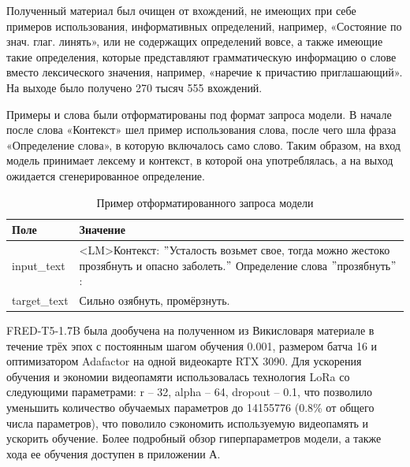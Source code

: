 \documentclass[LI,VKR]{HSEUniversity}
\begin{document}
Полученный материал был очищен от вхождений, не имеющих при себе примеров использования,
информативных определений, например, «Состояние по знач. глаг. линять»,
или не содержащих определений вовсе, а также имеющие такие определения,
которые представляют грамматическую информацию о слове вместо лексического значения,
например, «наречие к причастию приглашающий».
На выходе было получено 270 тысяч 555 вхождений.

Примеры и слова были отформатированы под формат запроса модели.
В начале после слова «Контекст» шел пример использования слова, после чего шла фраза
«Определение слова», в которую включалось само слово.
Таким образом, на вход модель
принимает лексему и контекст, в которой она употреблялась, а на выход ожидается сгенерированное
определение.

\begin{table}[h]
\centering
\caption{Пример отформатированного запроса модели}
\begin{tabular}{|m{2.5cm}|m{9.5cm}|}
\hline
\textbf{Поле}       & \textbf{Значение}                                                                                          \\
\hline
input\_text  & <LM>Контекст: \("\)Усталость возьмет свое, тогда можно жестоко прозябнуть и опасно заболеть.\("\) Определение слова \("\)прозябнуть\("\): \\
\hline
target\_text & Сильно озябнуть, промёрзнуть.                                                                              \\
\hline
\end{tabular}
\end{table}

FRED-T5-1.7B была дообучена на полученном из Викисловаря материале в течение трёх эпох
с постоянным шагом обучения 0.001, размером батча 16 и оптимизатором Adafactor
на одной видеокарте RTX 3090.
Для ускорения обучения и экономии видеопамяти использовалась технология LoRa со
следующими параметрами: r – 32, alpha – 64, dropout – 0.1, что позволило
уменьшить количество обучаемых параметров до 14155776 (0.8\% от общего числа параметров),
что поволило сэкономить используемую видеопамять и ускорить обучение.
Более подробный обзор гиперпараметров модели, а также хода ее обучения доступен в приложении А.
\end{document}
